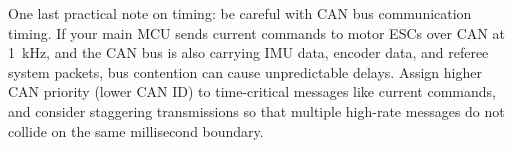 One last practical note on timing: be careful with CAN bus communication timing. If your main MCU sends current commands to motor ESCs over CAN at 1~kHz, and the CAN bus is also carrying IMU data, encoder data, and referee system packets, bus contention can cause unpredictable delays. Assign higher CAN priority (lower CAN ID) to time-critical messages like current commands, and consider staggering transmissions so that multiple high-rate messages do not collide on the same millisecond boundary.

\subsection*{}

